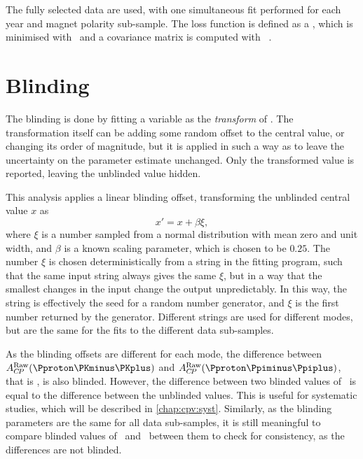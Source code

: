 The fully selected data are used, with one simultaneous fit performed for each 
year and magnet polarity sub-sample.
The loss function is defined as a \chisq, which is minimised with \migrad\ and 
a covariance matrix is computed with \hesse~\cite{James:1975dr,James:1994vla}.

\section{Blinding}
\label{chap:cpv:araw:blinding}

The blinding is done by fitting a variable as the \emph{transform} of \ARaw.
The transformation itself can be adding some random offset to the central 
value, or changing its order of magnitude, but it is applied in such a way as 
to leave the uncertainty on the parameter estimate unchanged.
Only the transformed value is reported, leaving the unblinded value hidden.

This analysis applies a linear blinding offset, transforming the unblinded 
central value $x$ as
\begin{equation}
  x' = x + \beta\xi,
\end{equation}
where $\xi$ is a number sampled from a normal distribution with mean zero and 
unit width, and $\beta$ is a known scaling parameter, which is chosen to be 
$0.25$.
The number $\xi$ is chosen deterministically from a string in the fitting 
program, such that the same input string always gives the same $\xi$, but in a 
way that the smallest changes in the input change the output unpredictably.
In this way, the string is effectively the seed for a random number generator, 
and $\xi$ is the first number returned by the generator.
Different strings are used for different modes, but are the same for the fits 
to the different data sub-samples.

As the blinding offsets are different for each mode, the difference between 
$\ARaw(\pKK)$ and $\ARaw(\ppipi)$, that is \dACP, is also blinded.
However, the difference between two blinded values of \dACP\ is equal to the 
difference between the unblinded values.
This is useful for systematic studies, which will be described in 
\cref{chap:cpv:syst}.
Similarly, as the blinding parameters are the same for all data sub-samples, it 
is still meaningful to compare blinded values of \ARaw\ and \dACP\ between them 
to check for consistency, as the differences are not blinded.

